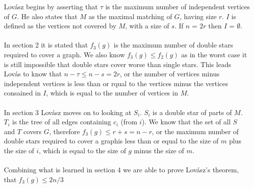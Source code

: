 \documentclass{article}
\begin{document}
	Lov\'asz begins by asserting that $\tau$ is the maximum number of independent vertices of $G$. He also states that $M$ as the maximal matching of $G$, having size $r$. $I$ is defined as the vertices not covered by $M$, with a size of $s$. If $n$ = $2r$ then $I$ = $\emptyset$.
	\\\\
	In section 2 it is stated that $f_{3}(g)$ is the maximum number of double stars required to cover a graph. We also know $f_{3}(g) \leq f_{2}(g)$ as in the worst case it is still impossible that double stars cover worse than single stars. This leads Lov\'as to know that $n-\tau \leq n-s = 2r$, or the number of vertices minus independent vertices is less than or rqual to the vertices minus the vertices consained in $I$, which is equal to the number of vertices in $M$.
	\\\\
	In section 3 Lov\'asz moves on to looking at $S_{i}$. $S_{i}$ is a double star of parts of $M$. $T_{i}$ is the tree of all edges containing $c_{i}$ (from $i$). We know that the set of all $S$ and $T$ covers $G$, therefore $f_{3}(g) \leq r + s = n - r$, or the maximum number of double stars required to cover a graphis less than or equal to the size of $m$ plus the size of $i$, which is equal to the size of $g$ minus the size of $m$.
	\\\\
	Combining what is learned in section 4 we are able to prove Lov\'asz's theorem, that $f_{3}(g) \leq 2n/3$
	
\end{document}
